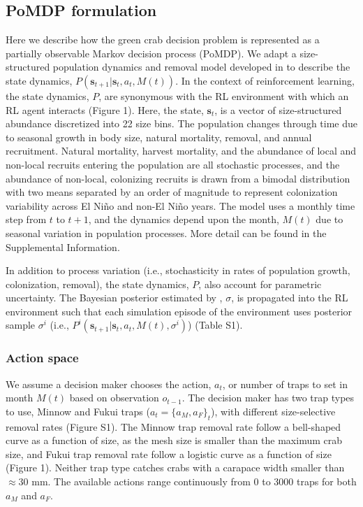 \documentclass{article}
\begin{document}
\subsection{PoMDP formulation}

Here we describe how the green crab decision problem is represented as a partially observable Markov decision process (PoMDP). We adapt a size-structured population dynamics and removal model developed in \cite{keller2026integrated} to describe the state dynamics, $P(\textbf{s}_{t+1}|\textbf{s}_t,a_t, M(t))$. In the context of reinforcement learning, the state dynamics, $P$, are synonymous with the RL environment with which an RL agent interacts (Figure 1). Here, the state, $\textbf{s}_t$, is a vector of size-structured abundance discretized into 22 size bins. The population changes through time due to seasonal growth in body size, natural mortality, removal, and annual recruitment. Natural mortality, harvest mortality, and the abundance of local and non-local recruits entering the population are all stochastic processes, and the abundance of non-local, colonizing recruits is drawn from a bimodal distribution with two means separated by an order of magnitude to represent colonization variability across El Niño and non-El Niño years. The model uses a monthly time step from $t$ to $t+1$, and the dynamics depend upon the month, $M(t)$ due to seasonal variation in population processes. More detail can be found in the Supplemental Information.

In addition to process variation (i.e., stochasticity in rates of population growth, colonization, removal), the state dynamics, $P$, also account for parametric uncertainty. The Bayesian posterior estimated by \cite{keller2026integrated}, $\sigma$, is propagated into the RL environment such that each simulation episode of the environment uses posterior sample $\sigma^i$ (i.e., $P^i(\textbf{s}_{t+1}|\textbf{s}_t,a_t, M(t), \sigma^i)$) (Table S1).

\subsubsection{Action space}

We assume a decision maker chooses the action, $a_t$, or number of traps to set in month $M(t)$ based on observation $o_{t-1}$. The decision maker has two trap types to use, Minnow and Fukui traps ($a_t=\{a_M, a_F\}_t$), with different size-selective removal rates (Figure S1). The Minnow trap removal rate follow a bell-shaped curve as a function of size, as the mesh size is smaller than the maximum crab size, and Fukui trap removal rate follow a logistic curve as a function of size (Figure 1). Neither trap type catches crabs with a carapace width smaller than $\approx 30$ mm. The available actions range continuously from 0 to 3000 traps for both $a_M$ and $a_F$. 
\end{document}
